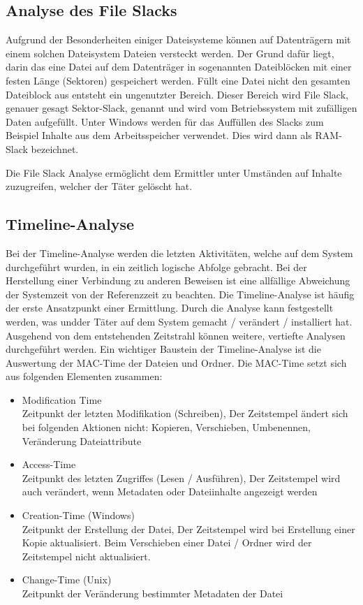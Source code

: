 \subsection{Analyse des File Slacks}
Aufgrund der Besonderheiten einiger Dateisysteme können auf Datenträgern mit einem solchen Dateisystem Dateien versteckt werden. Der Grund dafür liegt, darin das eine Datei auf dem Datenträger in sogenannten Dateiblöcken mit einer festen Länge (Sektoren) gespeichert werden. Füllt eine Datei nicht den gesamten Dateiblock aus entsteht ein ungenutzter Bereich. Dieser Bereich wird File Slack, genauer gesagt Sektor-Slack, genannt und wird vom Betriebssystem mit zufälligen Daten aufgefüllt. Unter Windows werden für das Auffüllen des Slacks zum Beispiel Inhalte aus dem Arbeitsspeicher verwendet. Dies wird dann als RAM-Slack bezeichnet. 


Die File Slack Analyse ermöglicht dem Ermittler unter Umständen auf Inhalte zuzugreifen, welcher der Täter gelöscht hat.



\subsection{Timeline-Analyse}
Bei der Timeline-Analyse werden die letzten Aktivitäten, welche auf dem System durchgeführt wurden, in ein zeitlich logische Abfolge gebracht. Bei der Herstellung einer Verbindung zu anderen Beweisen ist eine allfällige Abweichung der Systemzeit von der Referenzzeit zu beachten. Die Timeline-Analyse ist häufig der erste Ansatzpunkt einer Ermittlung. Durch die Analyse kann festgestellt werden, was undder Täter auf dem System gemacht / verändert / installiert hat. Ausgehend von dem entstehenden Zeitstrahl können weitere, vertiefte Analysen durchgeführt werden. Ein wichtiger Baustein der Timeline-Analyse ist die Auswertung der MAC-Time der Dateien und Ordner. Die MAC-Time setzt sich aus folgenden Elementen zusammen:

\begin{itemize}
\item Modification Time\\
Zeitpunkt der letzten Modifikation (Schreiben), Der Zeitstempel ändert sich bei folgenden Aktionen nicht: Kopieren, Verschieben, Umbenennen, Veränderung Dateiattribute
\item Access-Time\\
Zeitpunkt des letzten Zugriffes (Lesen / Ausführen), Der Zeitstempel wird auch verändert, wenn Metadaten oder Dateiinhalte angezeigt werden
\item Creation-Time (Windows)\\
Zeitpunkt der Erstellung der Datei, Der Zeitstempel wird bei Erstellung einer Kopie aktualisiert. Beim Verschieben einer Datei / Ordner wird der Zeitstempel nicht aktualisiert.
\item Change-Time (Unix)\\
Zeitpunkt der Veränderung bestimmter Metadaten der Datei
\end{itemize}

